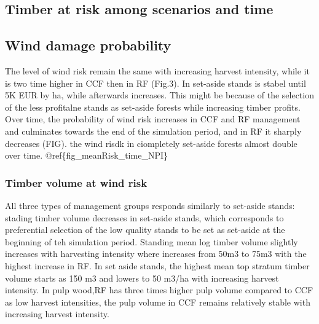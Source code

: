 \documentclass[]{elsarticle} %
\begin{document}
\hypertarget{timber-at-risk-among-scenarios-and-time}{%
\subsection{Timber at risk among scenarios and time}\label{timber-at-risk-among-scenarios-and-time}}

\hypertarget{wind-damage-probability}{%
\subsection{Wind damage probability}\label{wind-damage-probability}}

The level of wind risk remain the same with increasing harvest intensity, while it is two time higher in CCF then in RF (Fig.3). In set-aside stands is stabel until 5K EUR by ha, while afterwards increases. This might be because of the selection of the less profitalne stands as set-aside forests while increasing timber profits. Over time, the probability of wind risk increases in CCF and RF management and culminates towards the end of the simulation period, and in RF it sharply decreases (FIG). the wind risdk in ciompletely set-aside forests almost double over time. @ref\{fig\_meanRisk\_time\_NPI\}

\hypertarget{timber-volume-at-wind-risk}{%
\subsubsection{Timber volume at wind risk}\label{timber-volume-at-wind-risk}}

All three types of management groups responds similarly to set-aside stands: stading timber volume decreases in set-aside stands, which corresponds to preferential selection of the low quality stands to be set as set-aside at the beginning of teh simulation period. Standing mean log timber volume slightly increases with harvesting intensity where increases from 50m3 to 75m3 with the highest increase in RF. In set aside stands, the highest mean top stratum timber volume starts as 150 m3 and lowers to 50 m3/ha with increasing harvest intensity. In pulp wood,RF has three times higher pulp volume compared to CCF as low harvest intensities, the pulp volume in CCF remains relatively stable with increasing harvest intensity.
\end{document}
